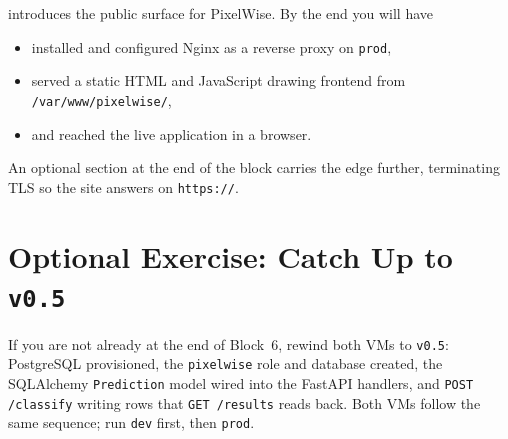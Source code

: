  introduces the public
surface for PixelWise.
By the end you will have
\begin{itemize}
    \item installed and configured Nginx as a reverse proxy on \texttt{prod},
    \item served a static HTML and JavaScript drawing frontend from \texttt{/var/www/pixelwise/},
    \item and reached the live application in a browser.
\end{itemize}
An optional section at the end of the block carries the edge further,
terminating TLS so the site answers on \texttt{https://}.



\newpage
\section{Optional Exercise: Catch Up to \texttt{v0.5}}


If you are not already at the end of Block~6, rewind both VMs to
\texttt{v0.5}: PostgreSQL provisioned, the \texttt{pixelwise} role and
database created, the SQLAlchemy \texttt{Prediction} model wired into
the FastAPI handlers, and \texttt{POST /classify} writing rows that
\texttt{GET /results} reads back. Both VMs follow the same sequence;
run \texttt{dev} first, then \texttt{prod}.


